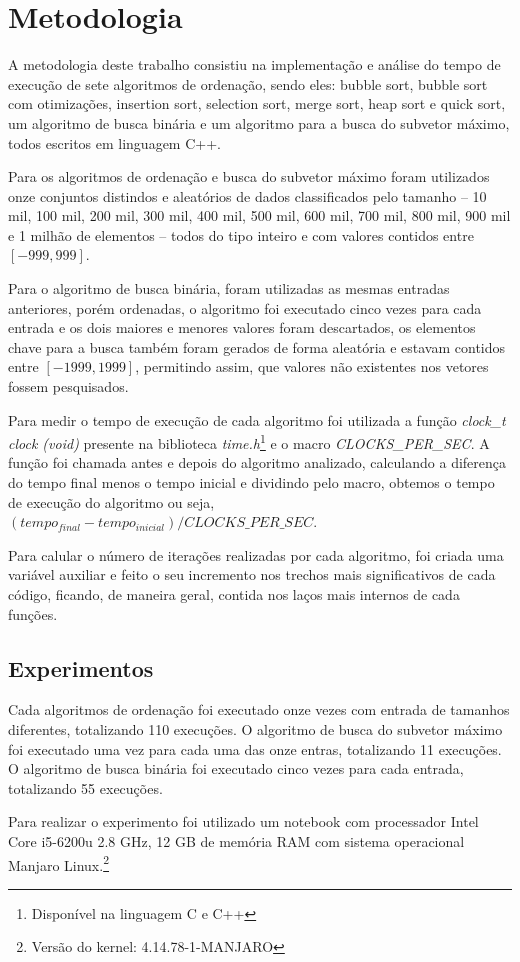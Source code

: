 \section{Metodologia} \label{sec:metodologia}
A metodologia deste trabalho consistiu na implementação e análise do tempo de execução de sete algoritmos de ordenação, sendo eles: bubble sort, bubble sort com otimizações, insertion sort, selection sort, merge sort, heap sort e quick sort, um algoritmo de busca binária e um algoritmo para a busca do subvetor máximo, todos escritos em linguagem C++.

Para os algoritmos de ordenação e busca do subvetor máximo foram utilizados onze conjuntos distindos e aleatórios de dados classificados pelo tamanho -- 10 mil, 100 mil, 200 mil, 300 mil, 400 mil, 500 mil, 600 mil, 700 mil, 800 mil, 900 mil e 1 milhão de elementos -- todos do tipo inteiro e com valores contidos entre $[-999, 999]$.

Para o algoritmo de busca binária, foram utilizadas as mesmas entradas anteriores, porém ordenadas, o algoritmo foi executado cinco vezes para cada entrada e os dois maiores e menores valores foram descartados, os elementos chave para a busca também foram gerados de forma aleatória e estavam contidos entre $[-1999, 1999]$, permitindo assim, que valores não existentes nos vetores fossem pesquisados.

Para medir o tempo de execução de cada algoritmo foi utilizada a função \textit{clock\_t clock (void)} presente na biblioteca \textit{time.h}\footnote{Disponível na linguagem C e C++} e o macro \textit{CLOCKS\_PER\_SEC}. A função foi chamada antes e depois do algoritmo analizado, calculando a diferença do tempo final menos o tempo inicial e dividindo pelo macro, obtemos o tempo de execução do algoritmo ou seja,
$(tempo_{final} - tempo_{inicial}) / CLOCKS\_PER\_SEC$.

Para calular o número de iterações realizadas por cada algoritmo, foi criada uma variável auxiliar e feito o seu incremento nos trechos mais significativos de cada código, ficando, de maneira geral, contida nos laços mais internos de cada funções.
\subsection{Experimentos}
Cada algoritmos de ordenação foi executado onze vezes com entrada de tamanhos diferentes, totalizando 110 execuções. O algoritmo de busca do subvetor máximo foi executado uma vez para cada uma das onze entras, totalizando 11 execuções. O algoritmo de busca binária foi executado cinco vezes para cada entrada, totalizando 55 execuções.

Para realizar o experimento foi utilizado um notebook com processador Intel Core i5-6200u 2.8 GHz, 12 GB de memória RAM com sistema operacional Manjaro Linux.\footnote{Versão do kernel: 4.14.78-1-MANJARO}
